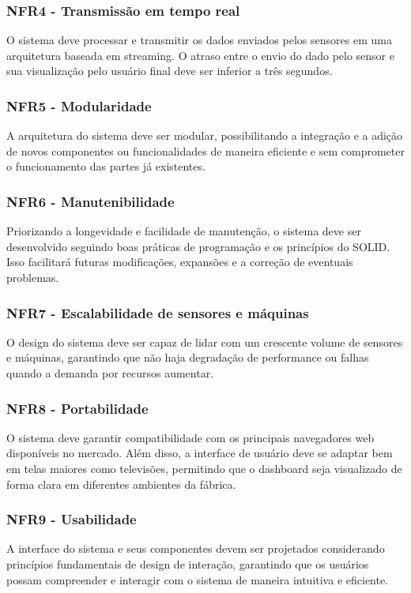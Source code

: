 \subsubsection{NFR4 - Transmissão em tempo real}
O sistema deve processar e transmitir os dados enviados pelos sensores em uma arquitetura baseada em streaming. O atraso entre o envio do dado pelo sensor e sua visualização pelo usuário final deve ser inferior a três segundos.

\subsubsection{NFR5 - Modularidade}
A arquitetura do sistema deve ser modular, possibilitando a integração e a adição de novos componentes ou funcionalidades de maneira eficiente e sem comprometer o funcionamento das partes já existentes.


\subsubsection{NFR6 - Manutenibilidade}
Priorizando a longevidade e facilidade de manutenção, o sistema deve ser desenvolvido seguindo boas práticas de programação e os princípios do SOLID. Isso facilitará futuras modificações, expansões e a correção de eventuais problemas.

\subsubsection{NFR7 - Escalabilidade de sensores e máquinas}
O design do sistema deve ser capaz de lidar com um crescente volume de sensores e máquinas, garantindo que não haja degradação de performance ou falhas quando a demanda por recursos aumentar.

\subsubsection{NFR8 - Portabilidade}
O sistema deve garantir compatibilidade com os principais navegadores web disponíveis no mercado. Além disso, a interface de usuário deve se adaptar bem em telas maiores como televisões, permitindo que o dashboard seja visualizado de forma clara em diferentes ambientes da fábrica.

\subsubsection{NFR9 - Usabilidade}
A interface do sistema e seus componentes devem ser projetados considerando princípios fundamentais de design de interação, garantindo que os usuários possam compreender e interagir com o sistema de maneira intuitiva e eficiente.


